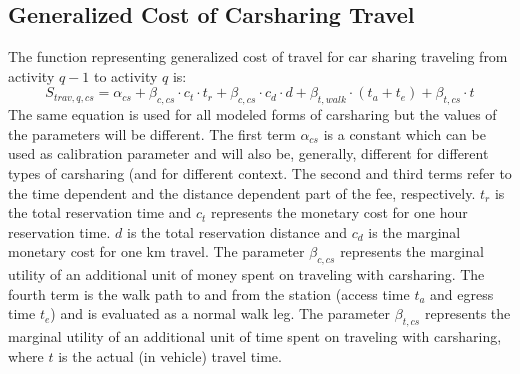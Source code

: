 \subsection{Generalized Cost of Carsharing Travel}
The function representing generalized cost of travel for car sharing traveling from activity $q-1$ to activity $q$ is:
%
\begin{equation}
S_{trav, q, cs} = \alpha_{cs} + \beta_{c,cs} \cdot c_{t} \cdot t_r + \beta_{c,cs} \cdot c_d \cdot d + \beta_{t, walk} \cdot (t_a + t_e) + \beta_{t,cs} \cdot  t
\end{equation}
%
The same equation is used for all modeled forms of carsharing but the values of the parameters will be different. 
%
The first term $\alpha_{cs}$ is a constant which can be used as calibration parameter and will also be, generally, different for different types of carsharing (and for different context.
%
The second and third terms refer to the time dependent and the distance dependent part of the fee, respectively. 
%
$t_r$ is the total reservation time and $c_t$ represents the monetary cost for one hour reservation time.
%
$d$ is the total reservation distance and $c_d$ is the marginal monetary cost for one km travel. 
%
The parameter $\beta_{c,cs}$ represents the marginal utility of an additional unit of money spent on traveling with carsharing. 
%
The fourth term is the walk path to and from the station (access time $t_a$ and egress time $t_e$) and is evaluated as a normal walk leg. 
%
The parameter $\beta_{t,cs}$ represents the marginal utility of an additional unit of time spent on traveling with carsharing, where $t$ is the actual (in vehicle) travel time. 

